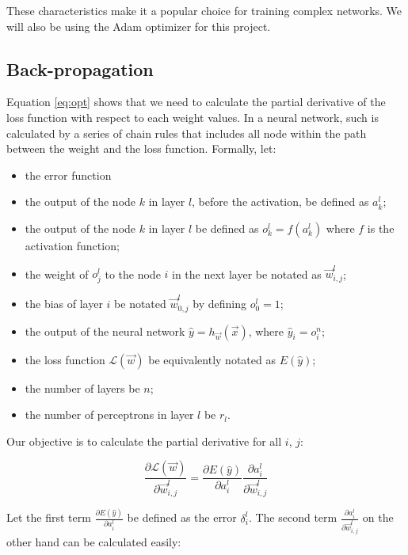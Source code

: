 \documentclass[12pt,a4paper,]{report}
\providecommand{\tightlist}{%
  \setlength{\itemsep}{0pt}\setlength{\parskip}{0pt}}
\begin{document}
These characteristics make it a popular choice for training complex
networks. We will also be using the Adam optimizer for this project.

\hypertarget{back-propagation}{%
\subsection{Back-propagation}\label{back-propagation}}

Equation \ref{eq:opt} shows that we need to calculate the partial
derivative of the loss function with respect to each weight values. In a
neural network, such is calculated by a series of chain rules that
includes all node within the path between the weight and the loss
function. Formally, let:

\begin{itemize}
\tightlist
\item
  the error function
\item
  the output of the node \(k\) in layer \(l\), before the activation, be
  defined as \(a^l_k\);
\item
  the output of the node \(k\) in layer \(l\) be defined as
  \(o^l_k = f(a^l_k)\) where \(f\) is the activation function;
\item
  the weight of \(o^l_j\) to the node \(i\) in the next layer be notated
  as \(\vec{w}^l_{i, j}\);
\item
  the bias of layer \(i\) be notated \(\vec{w}^l_{0,j}\) by defining
  \(o^l_0 = 1\);
\item
  the output of the neural network \(\hat{y} = h_{\vec{w}}(\vec{x})\),
  where \(\hat{y}_i = o^n_i\);
\item
  the loss function \(\mathcal{L}(\vec{w})\) be equivalently notated as
  \(E(\hat{y})\);
\item
  the number of layers be \(n\);
\item
  the number of perceptrons in layer \(l\) be \(r_l\).
\end{itemize}

Our objective is to calculate the partial derivative for all \(i\),
\(j\):

\begin{equation}
    \frac{\partial \mathcal{L}(\vec{w})}{\partial \vec{w}^l_{i, j}} = \frac{\partial E(\hat{y})}{\partial a^l_i} \frac{\partial a^l_i}{\partial \vec{w}^l_{i, j}}
\end{equation}

Let the first term \(\frac{\partial E(\hat{y})}{\partial a^l_i}\) be
defined as the error \(\delta^l_i\). The second term
\(\frac{\partial a^l_i}{\partial \vec{w}^l_{i, j}}\) on the other hand
can be calculated easily:
\end{document}
